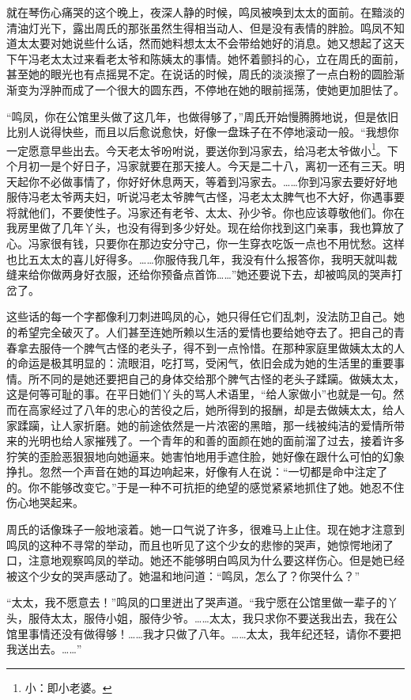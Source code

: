 \par 就在琴伤心痛哭的这个晚上，夜深人静的时候，鸣凤被唤到太太的面前。在黯淡的清油灯光下，露出周氏的那张虽然生得相当动人、但是没有表情的胖脸。鸣凤不知道太太要对她说些什么话，然而她料想太太不会带给她好的消息。她又想起了这天下午冯老太太过来看老太爷和陈姨太的事情。她怀着颤抖的心，立在周氏的面前，甚至她的眼光也有点摇晃不定。在说话的时候，周氏的淡淡擦了一点白粉的圆脸渐渐变为浮肿而成了一个很大的圆东西，不停地在她的眼前摇荡，使她更加胆怯了。
\par “鸣凤，你在公馆里头做了这几年，也做得够了，”周氏开始慢腾腾地说，但是依旧比别人说得快些，而且以后愈说愈快，好像一盘珠子在不停地滚动一般。“我想你一定愿意早些出去。今天老太爷吩咐说，要送你到冯家去，给冯老太爷做小\footnote{小：即小老婆。}。下个月初一是个好日子，冯家就要在那天接人。今天是二十八，离初一还有三天。明天起你不必做事情了，你好好休息两天，等着到冯家去。……你到冯家去要好好地服侍冯老太爷两夫妇，听说冯老太爷脾气古怪，冯老太太脾气也不大好，你遇事要将就他们，不要使性子。冯家还有老爷、太太、孙少爷。你也应该尊敬他们。你在我房里做了几年丫头，也没有得到多少好处。现在给你找到这门亲事，我也算放了心。冯家很有钱，只要你在那边安分守己，你一生穿衣吃饭一点也不用忧愁。这样也比五太太的喜儿好得多。……你服侍我几年，我没有什么报答你，我明天就叫裁缝来给你做两身好衣服，还给你预备点首饰……”她还要说下去，却被鸣凤的哭声打岔了。
\par 这些话的每一个字都像利刀刺进鸣凤的心，她只得任它们乱刺，没法防卫自己。她的希望完全破灭了。人们甚至连她所赖以生活的爱情也要给她夺去了。把自己的青春拿去服侍一个脾气古怪的老头子，得不到一点怜惜。在那种家庭里做姨太太的人的命运是极其明显的：流眼泪，吃打骂，受闲气，依旧会成为她的生活里的重要事情。所不同的是她还要把自己的身体交给那个脾气古怪的老头子蹂躏。做姨太太，这是何等可耻的事。在平日她们丫头的骂人术语里，“给人家做小”也就是一句。然而在高家经过了八年的忠心的苦役之后，她所得到的报酬，却是去做姨太太，给人家蹂躏，让人家折磨。她的前途依然是一片浓密的黑暗，那一线被纯洁的爱情所带来的光明也给人家摧残了。一个青年的和善的面颜在她的面前溜了过去，接着许多狞笑的歪脸恶狠狠地向她逼来。她害怕地用手遮住脸，她好像在跟什么可怕的幻象挣扎。忽然一个声音在她的耳边响起来，好像有人在说：“一切都是命中注定了的。你不能够改变它。”于是一种不可抗拒的绝望的感觉紧紧地抓住了她。她忍不住伤心地哭起来。
\par 周氏的话像珠子一般地滚着。她一口气说了许多，很难马上止住。现在她才注意到鸣凤的这种不寻常的举动，而且也听见了这个少女的悲惨的哭声，她惊愕地闭了口，注意地观察鸣凤的举动。她还不能够明白鸣凤为什么要这样伤心。但是她已经被这个少女的哭声感动了。她温和地问道：“鸣凤，怎么了？你哭什么？”
\par “太太，我不愿意去！”鸣凤的口里迸出了哭声道。“我宁愿在公馆里做一辈子的丫头，服侍太太，服侍小姐，服侍少爷。……太太，我只求你不要送我出去，我在公馆里事情还没有做得够！……我才只做了八年。……太太，我年纪还轻，请你不要把我送出去。……”
